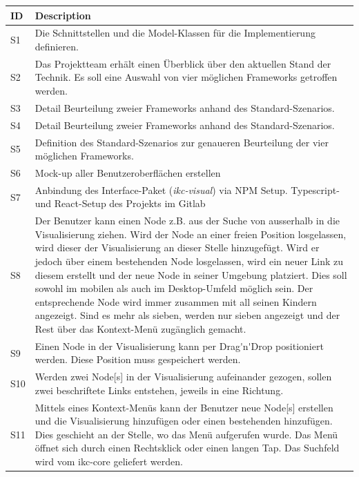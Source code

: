 \begin{longtable}{|p{1cm} | p{10.8cm} |}
\hline
ID  & Description\\ \hline
S1  & Die Schnittstellen und die Model-Klassen für die Implementierung definieren.     \\ \hline
S2  & Das Projektteam erhält einen Überblick über den aktuellen Stand der Technik. Es soll eine Auswahl von vier möglichen Frameworks getroffen werden.\\ \hline
S3  & Detail Beurteilung zweier Frameworks anhand des Standard-Szenarios.\\ \hline
S4  & Detail Beurteilung zweier Frameworks anhand des Standard-Szenarios. \\ \hline
S5  & Definition des Standard-Szenarios zur genaueren Beurteilung der vier möglichen Frameworks. \\ \hline
S6  & Mock-up aller Benutzeroberflächen erstellen \\ \hline
S7  & Anbindung des Interface-Paket (\textit{ikc-visual}) via NPM Setup. Typescript- und React-Setup des Projekts im Gitlab \\ \hline
S8  & Der Benutzer kann einen \gls{Node} z.B. aus der Suche von ausserhalb in die Visualisierung ziehen. Wird der \gls{Node} an einer freien Position losgelassen, wird dieser der Visualisierung an dieser Stelle hinzugefügt. Wird er jedoch über einem bestehenden \gls{Node} losgelassen, wird ein neuer Link zu diesem erstellt und der neue \gls{Node} in seiner Umgebung platziert. Dies soll sowohl im mobilen als auch im Desktop-Umfeld möglich sein. Der entsprechende \gls{Node} wird immer zusammen mit all seinen Kindern angezeigt. Sind es mehr als sieben, werden nur sieben angezeigt und der Rest über das Kontext-Menü zugänglich gemacht.\\ \hline
S9  & Einen \gls{Node} in der Visualisierung kann per \gls{Drag'n'Drop} positioniert werden. Diese Position muss gespeichert werden.    \\ \hline
S10 & Werden zwei \gls{Node}[s] in der Visualisierung aufeinander gezogen, sollen zwei beschriftete Links entstehen, jeweils in eine Richtung.       \\ \hline
S11 & Mittels eines Kontext-Menüs kann der Benutzer neue \gls{Node}[s] erstellen und die Visualisierung hinzufügen oder einen bestehenden hinzufügen. Dies geschieht an der Stelle, wo das Menü aufgerufen wurde. Das Menü öffnet sich durch einen Rechtsklick oder einen langen Tap. Das Suchfeld wird vom \gls{ikc-core} geliefert werden. \\ \hline

\end{longtable}
